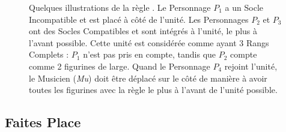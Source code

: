 \newcommand{\figFRFront}{Avant}
\newcommand{\figFRCharOne}{\normalfontsize$ P_{1} $}
\newcommand{\figFRCharTwo}{\normalfontsize$ P_{2} $}
\newcommand{\figFRCharThree}{\normalfontsize$ P_{3} $}
\newcommand{\figFRCharFour}{\normalfontsize$ P_{4} $}
\newcommand{\figFRChamp}{\normalfontsize\textit{Ch}}
\newcommand{\figFRStand}{\normalfontsize\textit{Ét}}
\newcommand{\figFRMus}{\normalfontsize\textit{Mu}}

\begin{figure}[!htbp]
\begin{minipage}{0.3\textwidth}
\def\svgwidth{\textwidth}

\end{minipage}
\hfill\begin{minipage}{0.57\textwidth}
\caption{Quelques illustrations de la règle \frontrank{}.\vspace*{10pt}\newline
Le Personnage $ P_{1} $ a un Socle Incompatible et est placé à côté de l'unité. Les Personnages $ P_{2} $ et $ P_{3} $ ont des Socles Compatibles et sont intégrés à l'unité, le plus à l'avant possible. Cette unité est considérée comme ayant 3 Rangs Complets : $ P_{1} $ n'est pas pris en compte, tandis que $ P_{2} $ compte comme 2 figurines de large.\vspace*{10pt}\newline
Quand le Personnage $ P_{4} $ rejoint l'unité, le Musicien (\textit{Mu}) doit être déplacé sur le côté de manière à avoir toutes les figurines avec la règle \frontrank{} le plus à l'avant de l'unité possible.}
\label{figure/front_rank}
\end{minipage}
\end{figure}

\subsection{Faites Place}



